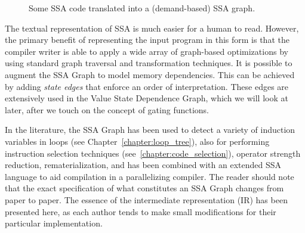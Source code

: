 \begin{figure}[ht]
\centering
{}

\caption{Some SSA code translated into a (demand-based) SSA graph.}
\label{fig:ssa-graph-example-code}
\end{figure}

The textual representation of SSA is much easier for a human to read. 
However, the primary benefit of representing the input program in this form is that the compiler writer is able to apply a wide array of graph-based optimizations by using standard graph traversal and transformation techniques. 
It is possible to augment the SSA Graph to model memory dependencies. 
This can be achieved by adding \textit{state edges} that enforce an order of interpretation. 
These edges are extensively used in the Value State Dependence Graph, which we will look at later, after we touch on the concept of gating functions.

In the literature, the SSA Graph has been used to detect a variety of induction variables in loops (see Chapter~\ref{chapter:loop_tree}), also for performing instruction selection techniques (see~\ref{chapter:code_selection}), operator strength reduction, rematerialization, and has been combined with an extended SSA language to aid compilation in a parallelizing compiler. 
The reader should note that the exact specification of what constitutes an SSA Graph changes from paper to paper. 
The essence of the intermediate representation (IR) has been presented here, as each author tends to make small modifications for their particular implementation.

